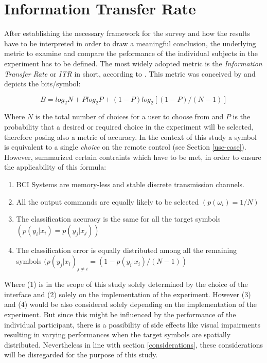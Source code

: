         \section{Information Transfer Rate}\label{itr}

            After establishing the necessary framework for the survey and how the results have to be interpreted in order to draw a meaningful conclusion, the underlying metric to examine and compare the peformance of the individual subjects in the experiment has to be defined. The most widely adopted metric is the \textit{Information Transfer Rate} or \textit{ITR} in short, according to \cite[1]{Yuan.2013}. This metric was conceived by \cite{Wolpaw.1998} and depicts the bits/symbol:

            \begin{equation}\label{itr-basic}
               B = log_{2} N + P log_{2} P + (1-P) log_{2} [(1-P)/(N-1)]
            \end{equation}

            Where $N$ is the total number of choices for a user to choose from and $P$ is the probability that a desired or required choice in the experiment will be selected, therefore posing also a metric of accuracy. In the context of this study a symbol is equivalent to a single \textit{choice} on the remote control (see Section \ref*{use-case}). However, \cite[4]{Yuan.2013} summarized certain contraints which have to be met, in order to ensure the applicability of this formula:

            \begin{enumerate}
                \item BCI Systems are memory-less and stable discrete transmission channels.
                \item All the output commands are equally likely to be selected $(p(\omega_{i})=1/N)$
                \item The classification accuracy is the same for all the target symbols $(p(y_{i}\vert x_{i}) = p(y_{j}\vert x_{j}))$
                \item The classification error is equally distributed among all the remaining symbols $(p(y_{j}\vert x_{i})_{j \neq i} = (1-p(y_{i}\vert x_{i})/(N-1))$
            \end{enumerate}

            Where (1) is in the scope of this study solely determined by the choice of the interface and (2) solely on the implementation of the experiment. However (3) and (4) would be also considered solely depending on the implementation of the experiment. But since this might be influenced by the performance of the individual participant, there is a possibility of side effects like visual impairments resulting in varying performances when the target symbols are spatially distributed. Nevertheless in line with section \ref*{considerations}, these considerations will be disregarded for the purpose of this study.

